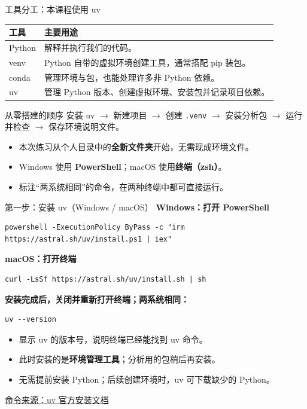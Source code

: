\documentclass[9pt]{ctexbeamer}
\begin{document}
\begin{frame}{工具分工：本课程使用 uv}
  \begin{tabular}{p{}p{}}
    \toprule
    工具 & 主要用途 \\
    \midrule
    Python & 解释并执行我们的代码。\\[5pt]
    venv & Python 自带的虚拟环境创建工具，通常搭配 pip 装包。\\[5pt]
    conda & 管理环境与包，也能处理许多非 Python 依赖。\\[5pt]
    uv & 管理 Python 版本、创建虚拟环境、安装包并记录项目依赖。\\
    \bottomrule
  \end{tabular}
  \vspace{0.35cm}
  \begin{block}{从零搭建的顺序}
    安装 uv $\rightarrow$ 新建项目 $\rightarrow$ 创建 \texttt{.venv}
    $\rightarrow$ 安装分析包 $\rightarrow$ 运行并检查 $\rightarrow$ 保存环境说明文件。
  \end{block}
  \begin{itemize}
    \item 本次练习从个人目录中的\textbf{全新文件夹}开始，无需现成环境文件。
    \item Windows 使用 \textbf{PowerShell}；macOS 使用\textbf{终端（zsh）}。
    \item 标注“两系统相同”的命令，在两种终端中都可直接运行。
  \end{itemize}
\end{frame}

\begin{frame}[fragile]{第一步：安装 uv（Windows / macOS）}
  \textbf{Windows：打开 PowerShell}
\begin{lstlisting}[language={},numbers=none,basicstyle=\ttfamily\scriptsize]
powershell -ExecutionPolicy ByPass -c "irm https://astral.sh/uv/install.ps1 | iex"
\end{lstlisting}
  \textbf{macOS：打开终端}
\begin{lstlisting}[language={},numbers=none]
curl -LsSf https://astral.sh/uv/install.sh | sh
\end{lstlisting}
  \textbf{安装完成后，关闭并重新打开终端；两系统相同：}
\begin{lstlisting}[language={},numbers=none]
uv --version
\end{lstlisting}
  \begin{itemize}
    \item 显示 uv 的版本号，说明终端已经能找到 uv 命令。
    \item 此时安装的是\textbf{环境管理工具}；分析用的包稍后再安装。
    \item 无需提前安装 Python；后续创建环境时，uv 可下载缺少的 Python。
  \end{itemize}
  {\tiny\href{https://docs.astral.sh/uv/getting-started/installation/}{命令来源：uv 官方安装文档}}
\end{frame}
\end{document}
